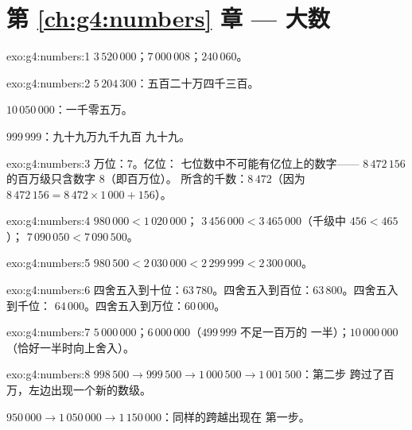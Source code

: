 \section*{第 \ref{ch:g4:numbers} 章 --- 大数}

\begin{solution}{exo:g4:numbers:1}
$3\,520\,000$；\quad $7\,000\,008$；\quad $240\,060$。
\end{solution}

\begin{solution}{exo:g4:numbers:2}
$5\,204\,300$：五百二十万四千三百。

$10\,050\,000$：一千零五万。

$999\,999$：九十九万九千九百
九十九。
\end{solution}

\begin{solution}{exo:g4:numbers:3}
万位：$7$。亿位：
七位数中不可能有亿位上的数字——
$8\,472\,156$ 的百万级只含数字 $8$（即百万位）。
所含的千数：$8\,472$（因为
$8\,472\,156 = 8\,472 \times 1\,000 + 156$）。
\end{solution}

\begin{solution}{exo:g4:numbers:4}
$980\,000 < 1\,020\,000$；\quad
$3\,456\,000 < 3\,465\,000$（千级中 $456 < 465$）；\quad
$7\,090\,050 < 7\,090\,500$。
\end{solution}

\begin{solution}{exo:g4:numbers:5}
$980\,500 < 2\,030\,000 < 2\,299\,999 < 2\,300\,000$。
\end{solution}

\begin{solution}{exo:g4:numbers:6}
四舍五入到十位：$63\,780$。四舍五入到百位：$63\,800$。四舍五入到千位：
$64\,000$。四舍五入到万位：$60\,000$。
\end{solution}

\begin{solution}{exo:g4:numbers:7}
$5\,000\,000$；\quad $6\,000\,000$（$499\,999$ 不足一百万的
一半）；\quad $10\,000\,000$（恰好一半时向上舍入）。
\end{solution}

\begin{solution}{exo:g4:numbers:8}
$998\,500 \to 999\,500 \to 1\,000\,500 \to 1\,001\,500$：第二步
跨过了百万，左边出现一个新的数级。

$950\,000 \to 1\,050\,000 \to 1\,150\,000$：同样的跨越出现在
第一步。
\end{solution}

